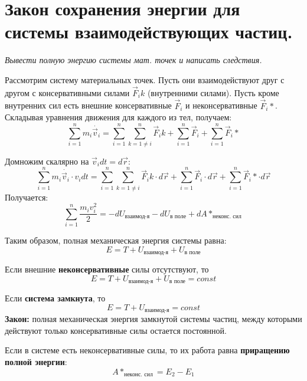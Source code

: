 \documentclass{article}
\begin{document}
   \section{Закон сохранения энергии для системы взаимодействующих частиц.}
    \par
      \textit{Вывести полную энергию системы мат. точек и написать следствия.}\\
    \par
      Рассмотрим систему материальных точек. Пусть они взаимодействуют друг с другом с консервативными силами $\vec F_ik$ (внутренними силами). Пусть кроме внутренних сил есть внешние консервативные $\vec F_i$ и неконсервативные $\vec F_i*$. Складывая уравнения движения для каждого из тел, получаем:
      \begin{equation}
	\sum_{i=1}^nm_i\dot{\vec v_i}=\sum_{i=1}^n\sum_{k=1\neq i}^n\vec F_ik+\sum_{i=1}^n \vec F_i + \sum_{i=1}^n \vec F_i*
      \end{equation}
    \par
      Домножим скалярно на $\vec v_idt=d\vec r$:
      \begin{equation}
	\sum_{i=1}^nm_i\dot{\vec v_i}\cdot v_i dt=\sum_{i=1}^n\sum_{k=1\neq i}^n\vec F_ik\cdot d\vec r+\sum_{i=1}^n \vec F_i\cdot d\vec r + \sum_{i=1}^n \vec F_i*\cdot d\vec r
      \end{equation}
      Получается:
      \begin{equation}
	\sum_{i=1}^n \frac{m_iv_i^2}{2}=-dU_\text{взаимод-я}-dU_\text{в поле}+dA*_\text{неконс. сил}
      \end{equation}
    \par
      Таким образом, полная механическая энергия системы равна:
      \begin{equation}
	E=T+U_\text{взаимод-я}+U_\text{в поле}
      \end{equation}
    \par
      Если внешние \textbf{неконсервативные} силы отсутствуют, то
	\begin{equation}
	  E=T+U_\text{взаимод-я}+U_\text{в поле}=const
	\end{equation}
    \par
      Если \textbf{система замкнута}, то
	\begin{equation}
	  E=T+U_\text{взаимод-я}=const
	\end{equation}
      \textbf{Закон:} полная механическая энергия замкнутой системы частиц, между которыми действуют только консервативные силы остается постоянной.
    \par
      Если в системе есть неконсервативные силы, то их работа равна \textbf{приращению полной энергии}:
      \begin{equation}
	A*_\text{неконс. сил}=E_2-E_1
      \end{equation}
  \clearpage
  
\end{document}
